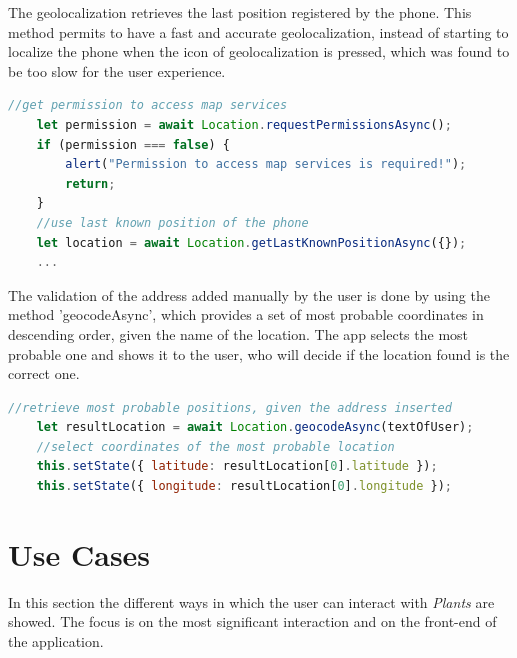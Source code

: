 \documentclass[10pt]{article}
\begin{document}
	The geolocalization retrieves the last position registered by the phone. This method permits to have a fast and accurate geolocalization, instead of starting to localize the phone when the icon of geolocalization is pressed, which was found to be too slow for the user experience.
	\begin{lstlisting}[language=JavaScript]
    //get permission to access map services
    let permission = await Location.requestPermissionsAsync();
    if (permission === false) {
        alert("Permission to access map services is required!");
        return;
    }
    //use last known position of the phone
    let location = await Location.getLastKnownPositionAsync({});
    ...
	\end{lstlisting}
	
	The validation of the address added manually by the user is done by using the method 'geocodeAsync', which provides a set of most probable coordinates in descending order, given the name of the location. The app selects the most probable one and shows it to the user, who will decide if the location found is the correct one.
	\begin{lstlisting}[language=JavaScript]
    //retrieve most probable positions, given the address inserted
    let resultLocation = await Location.geocodeAsync(textOfUser);
    //select coordinates of the most probable location
    this.setState({ latitude: resultLocation[0].latitude });
    this.setState({ longitude: resultLocation[0].longitude });
    \end{lstlisting}
	
	\newpage
	\section{Use Cases}
	In this section the different ways in which the user can interact with \textit{Plants} are showed. The focus is on the most significant interaction and on the front-end of the application.
    
\end{document}
